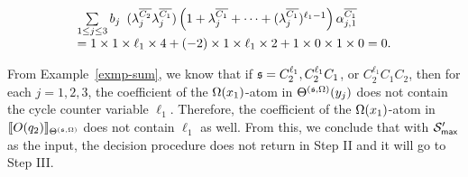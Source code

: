 \begin{example}
\begin{itemize}
\[
\begin{array}{l}
\sum \limits_{1 \le j \le 3} b_j
\begin{array}{l}
 (\lambda^{\overline{C_{2}}}_{j}\lambda^{\overline{C_{1}}}_{j})
\left(1+\lambda^{\overline{C_{1}}}_{j} + \dots + (\lambda^{\overline{C_{1}}}_{j})^{\ell_1-1} \right) \alpha^{\overline{C_{1}}}_{j, 1}
\end{array}
\\
= 1 \times 1 \times \ell_1 \times 4 + (-2) \times 1 \times \ell_1 \times 2 + 1 \times 0 \times 1 \times 0 =0.
\end{array}
\]
\end{itemize}
From Example~\ref{exmp-sum}, we know that if ${\mathfrak{s} }=C^{\ell_1}_2, C^{\ell_1}_2 C_1$, or $C^{\ell_1}_2 C_1 C_2$, then for each $j =1, 2,3$, the coefficient of the $\Omega(x_1)$-atom in $\Theta^{({\mathfrak{s} }, \Omega)}(y_j)$ does not contain the cycle counter variable $\ell_1$. Therefore, the coefficient of the $\Omega(x_1)$-atom in $\llbracket O(q_2)\rrbracket_{\Theta^{({\mathfrak{s} }, \Omega)}}$ does not contain $\ell_1$ as well. From this, we conclude that with ${\mathcal{S} }'_{\sf max}$ as the input, the decision procedure does not return in Step II and it will go to Step III.
\end{example}


